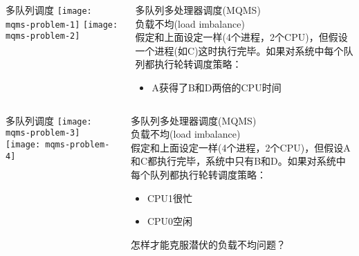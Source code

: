 \begin{frame}
	\begin{columns}
		\begin{column}{.5\textwidth}
			\Large \centering
			多队列调度
			\texttt{[image: mqms-problem-1]}
			\texttt{[image: mqms-problem-2]}	
		\end{column}
		
		\begin{column}{.5\textwidth}
			\large
			多队列多处理器调度(MQMS) \\
			负载不均(load imbalance) \\ 
			\normalsize
			假定和上面设定一样(4个进程，2个CPU)，但假设一个进程(如C)这时执行完毕。如果对系统中每个队列都执行轮转调度策略：
			
			\begin{itemize}
				\item A获得了B和D两倍的CPU时间

			\end{itemize}
		\end{column}
	\end{columns}
\end{frame}



\begin{frame}
	\begin{columns}
		\begin{column}{.5\textwidth}
			\Large \centering
			多队列调度
			\texttt{[image: mqms-problem-3]}
			\texttt{[image: mqms-problem-4]}	
		\end{column}
		
		\begin{column}{.5\textwidth}
			\large
			多队列多处理器调度(MQMS) \\
			负载不均(load imbalance) \\ 
			\normalsize
			假定和上面设定一样(4个进程，2个CPU)，但假设A和C都执行完毕，系统中只有B和D。如果对系统中每个队列都执行轮转调度策略：
			
			\begin{itemize}
				\item CPU1很忙
				\item CPU0空闲
				
			\end{itemize}
		\Large
		怎样才能克服潜伏的负载不均问题？
		\end{column}
	\end{columns}
\end{frame}



